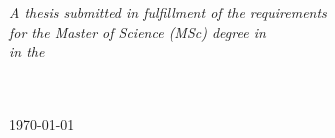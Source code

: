 \documentclass[
11pt, %
english, %
onehalfspacing, %
parskip, %
headsepline, %
]{MastersDoctoralThesis} %
\begin{document}
\begin{titlepage}
\begin{center}
\vfill

\large \textit{A thesis submitted in fulfillment of the requirements\\ for the Master of Science (MSc) degree in \degreename}\\[0.3cm] %
\textit{in the}\\[0.4cm]
\facname\\\deptname\\[1cm] %
 
\vfill

{\large \today}\\[4cm] %
 
\vfill
\end{center}
\end{titlepage}



 
\end{document}
